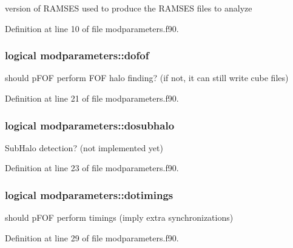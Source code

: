 version of R\-A\-M\-S\-E\-S used to produce the R\-A\-M\-S\-E\-S files to analyze 



Definition at line 10 of file modparameters.\-f90.

\hypertarget{classmodparameters_aac53717e97639df9afa75e2947a66f9e}{
\subsubsection[{dofof}]{\setlength{\rightskip}{0pt plus 5cm}logical modparameters\-::dofof}}\label{classmodparameters_aac53717e97639df9afa75e2947a66f9e}


should p\-F\-O\-F perform F\-O\-F halo finding? (if not, it can still write cube files) 



Definition at line 21 of file modparameters.\-f90.

\hypertarget{classmodparameters_ae2628157b1f65431117f867006409948}{
\subsubsection[{dosubhalo}]{\setlength{\rightskip}{0pt plus 5cm}logical modparameters\-::dosubhalo}}\label{classmodparameters_ae2628157b1f65431117f867006409948}


Sub\-Halo detection? (not implemented yet) 



Definition at line 23 of file modparameters.\-f90.

\hypertarget{classmodparameters_a3d21125b69403e3097f85434aa2bb08d}{
\subsubsection[{dotimings}]{\setlength{\rightskip}{0pt plus 5cm}logical modparameters\-::dotimings}}\label{classmodparameters_a3d21125b69403e3097f85434aa2bb08d}


should p\-F\-O\-F perform timings (imply extra synchronizations) 



Definition at line 29 of file modparameters.\-f90.

